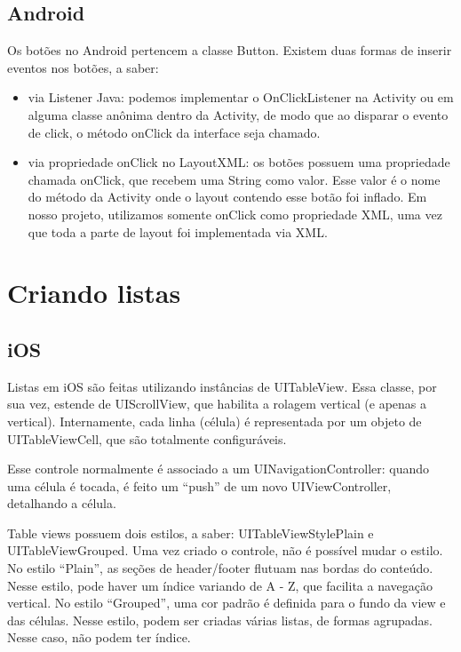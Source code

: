     \subsection{Android}
     
    Os botões no Android pertencem a classe Button. Existem duas formas de inserir eventos nos botões, a saber:
\begin{itemize}
\item via Listener Java: podemos implementar o OnClickListener na Activity ou em alguma classe anônima dentro da Activity, de modo que ao disparar o evento de click, o método onClick da interface seja chamado.
\item via propriedade onClick no LayoutXML: os botões possuem uma propriedade chamada onClick, que recebem uma String como valor. Esse valor é o nome do método da Activity onde o layout contendo esse botão foi inflado.
    Em nosso projeto, utilizamos somente onClick como propriedade \ac{XML}, uma vez que toda a parte de layout foi implementada via \ac{XML}.
\end{itemize}    
    \section {Criando listas}
    \subsection{iOS}
     
    Listas em iOS são feitas utilizando instâncias de UITableView. Essa classe, por sua vez, estende de UIScrollView, que habilita a rolagem vertical (e apenas a vertical). Internamente, cada linha (célula) é representada por um objeto de UITableViewCell, que são totalmente configuráveis.
    
	Esse controle normalmente é associado a um UINavigationController: quando uma célula é tocada, é feito um ``push'' de um novo UIViewController, detalhando a célula.
    
	Table views possuem dois estilos, a saber: UITableViewStylePlain e UITableViewGrouped. Uma vez criado o controle, não é possível mudar o estilo. No estilo ``Plain'', as seções de header/footer flutuam nas bordas do conteúdo. Nesse estilo, pode haver um índice variando de A - Z, que facilita a navegação vertical. No estilo ``Grouped'', uma cor padrão é definida para o fundo da view e das células. Nesse estilo, podem ser criadas várias listas, de formas agrupadas. Nesse caso, não podem ter índice.
    
